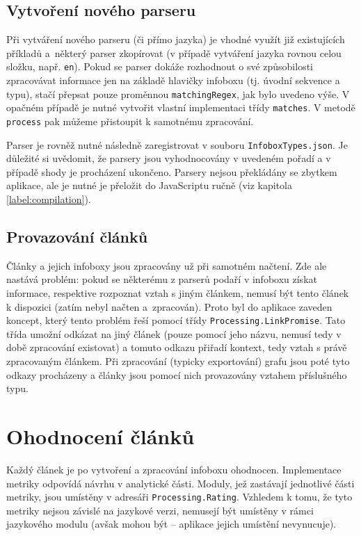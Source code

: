\subsection{Vytvoření nového parseru}
Při vytváření nového parseru (či přímo jazyka) je vhodné využít již existujících příkladů a~některý parser zkopírovat (v případě vytváření jazyka rovnou celou složku, např. \texttt{en}). Pokud se parser dokáže rozhodnout o své způsobilosti zpracovávat informace jen na základě hlavičky infoboxu (tj. úvodní sekvence a typu), stačí přepsat pouze proměnnou \texttt{matching\-Regex}, jak bylo uvedeno výše. V opačném případě je nutné vytvořit vlastní implementaci třídy \texttt{matches}. V metodě \texttt{process} pak můžeme přistoupit k samotnému zpracování.

Parser je rovněž nutné následně zaregistrovat v souboru \texttt{InfoboxTypes.json}. Je důležité si uvědomit, že parsery jsou vyhodnocovány v uvedeném pořadí a v případě shody je procházení ukončeno. Parsery nejsou překládány se zbytkem aplikace, ale je nutné je přeložit do JavaScriptu ručně (viz kapitola \ref{label:compilation}).

\subsection{Provazování článků}
\label{label:promises}
Články a jejich infoboxy jsou zpracovány už při samotném načtení. Zde ale nastává problém: pokud se některému z parserů podaří v infoboxu získat informace, respektive rozpoznat vztah s jiným článkem, nemusí být tento článek k dispozici (zatím nebyl načten a~zpracován). Proto byl do aplikace zaveden koncept, který tento problém řeší pomocí třídy \texttt{Processing.LinkPromise}. Tato třída umožní odkázat na jiný článek (pouze pomocí jeho názvu, nemusí tedy v době zpracování existovat) a tomuto odkazu přiřadí kontext, tedy vztah s právě zpracovaným článkem. Při zpracování (typicky exportování) grafu jsou poté tyto odkazy procházeny a články jsou pomocí nich provazovány vztahem příslušného typu.

\section{Ohodnocení článků}
Každý článek je po vytvoření a zpracování infoboxu ohodnocen. Implementace metriky odpovídá návrhu v analytické části. Moduly, jež zastávají jednotlivé části metriky, jsou umístěny v adresáři \texttt{Processing.Rating}. Vzhledem k tomu, že tyto metriky nejsou závislé na jazykové verzi, nemusejí být umístěny v rámci jazykového modulu (avšak mohou být -- aplikace jejich umístění nevynucuje).

